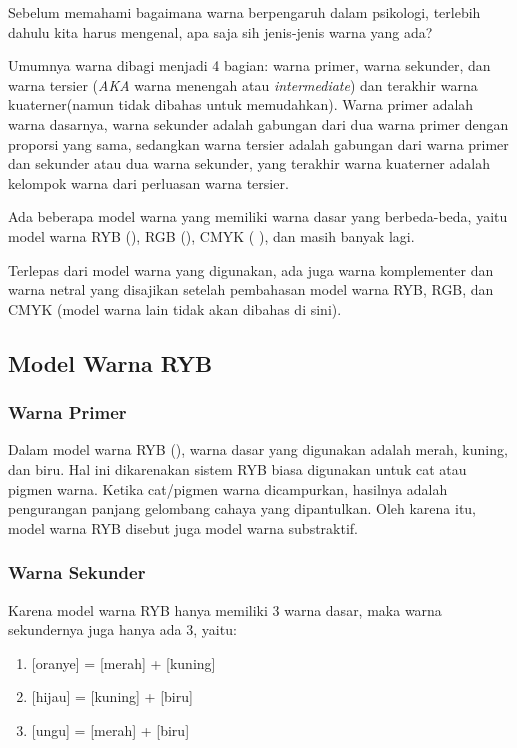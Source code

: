 \documentclass[a4paper]{article}
\newcommand{\warnalnbl}[1]{
  \tikz[baseline=-0.5\ht\strutbox]{
    \node[shape=rectangle, draw=black, fill=black, minimum height=1.5em, inner sep= 2pt, text=white]{#1}
  }
}
\begin{document}
Sebelum memahami bagaimana warna berpengaruh dalam psikologi, terlebih dahulu kita harus mengenal, apa saja sih jenis-jenis warna yang ada?

Umumnya warna dibagi menjadi 4 bagian: warna primer, warna sekunder, dan warna tersier (\textit{AKA} warna menengah atau \textit{intermediate}) dan terakhir warna kuaterner(namun tidak dibahas untuk memudahkan).
Warna primer adalah warna dasarnya, warna sekunder adalah gabungan dari dua warna primer dengan proporsi yang sama, sedangkan warna tersier adalah gabungan dari warna primer dan sekunder atau dua warna sekunder, yang terakhir warna kuaterner adalah kelompok warna dari perluasan warna tersier.

Ada beberapa model warna yang memiliki warna dasar yang berbeda-beda, yaitu model warna RYB (), RGB (), CMYK (\warnalnbl{Key/Black}), dan masih banyak lagi.

Terlepas dari model warna yang digunakan, ada juga warna komplementer dan warna netral yang disajikan setelah pembahasan model warna RYB, RGB, dan CMYK (model warna lain tidak akan dibahas di sini).

\subsection{Model Warna RYB}
\subsubsection{Warna Primer}
Dalam model warna RYB (), warna dasar yang digunakan adalah merah, kuning, dan biru. Hal ini dikarenakan sistem RYB biasa digunakan untuk cat atau pigmen warna. Ketika cat/pigmen warna dicampurkan, hasilnya adalah pengurangan panjang gelombang cahaya yang dipantulkan. Oleh karena itu, model warna RYB disebut juga model warna substraktif.

\subsubsection{Warna Sekunder}
Karena model warna RYB hanya memiliki 3 warna dasar, maka warna sekundernya juga hanya ada 3, yaitu:
\begin{enumerate}
  \item {}[oranye] = [merah] + [kuning]
  \item {}[hijau] = [kuning] + [biru]
  \item {}[ungu] = [merah] + [biru]
\end{enumerate}
\end{document}
